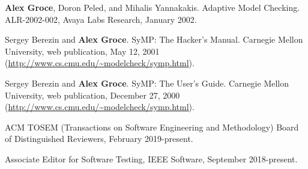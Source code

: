 \documentclass[ComputerScience]{vita}
\begin{document}
\begin{vita}
\begin{Technical Reports}
\item
{\bf Alex Groce}, Doron Peled, and Mihalis Yannakakis.
\newblock Adaptive Model Checking.
\newblock ALR-2002-002, Avaya Labs Research, January 2002.

\item
Sergey Berezin and {\bf Alex Groce}.
\newblock SyMP: The Hacker's Manual.
\newblock Carnegie Mellon University, web publication, May 12, 2001 (\url{http://www.cs.cmu.edu/~modelcheck/symp.html}).

\item
Sergey Berezin and {\bf Alex Groce}.
\newblock SyMP: The User's Guide.
\newblock Carnegie Mellon University, web publication, December 27, 2000 (\url{http://www.cs.cmu.edu/~modelcheck/symp.html}).
\end{Technical Reports}

\begin{Professional Activities and Service}
  \item ACM TOSEM (Transactions on Software Engineering and
    Methodology) Board of Distinguished Reviewers, February 2019-present.
  
  \item Associate Editor for Software Testing, IEEE Software,
    September 2018-present.


\end{Professional Activities and Service}
\end{vita}
\end{document}

